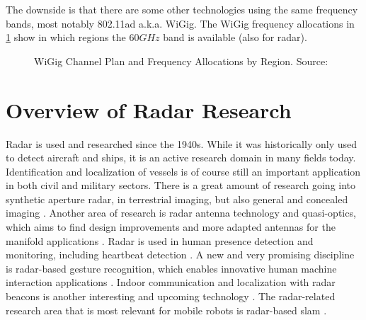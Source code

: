 The downside is that there are some other technologies using the same
frequency bands, most notably 802.11ad a.k.a.
WiGig\cite{AgilentTechnologies2013}. The WiGig frequency allocations in
\cref{fig:wigig} show in which regions the \(60GHz\) band is available (also
for radar).

\begin{figure}[htp]
    \centering
    \def\svgwidth{\linewidth}
    
    \caption{\label{fig:wigig}WiGig Channel Plan and Frequency Allocations by Region. Source: \cite{AgilentTechnologies2013}}
\end{figure}

\section{Overview of Radar Research}\label{overview-of-radar-research}

Radar is used and researched since the 1940s. While it was historically only used to detect aircraft and ships, it is an active research domain in many fields today.
Identification and localization of vessels is of course still an important application in both civil and military sectors.
There is a great amount of research going into synthetic aperture radar, in terrestrial imaging, but also general and concealed imaging \cite{Cumming2004,Axelsson2002,Bury2007,Wang2008,Sarmap.ch2009,Moreira2013,Watts2016}.
Another area of research is radar antenna technology and quasi-optics, which aims to find design improvements and more adapted antennas for the manifold applications \cite{Lu2014,Tewari2015,Gorniak2008,Vinicchayakul2016,Bisognin2014,Ernst2016a,Nordin2016,Craeye2008}.
Radar is used in human presence detection and monitoring, including heartbeat detection \cite{Valmori2016,Novak2017,Zhong2016,Mabrouk2015,Ernst2016,Molchanov2011,Sakamoto2015,Molchanov2011a,Jian2014}.
A new and very promising discipline is radar-based gesture recognition, which enables innovative human machine interaction applications \cite{Lien2016,Kim2016,Molchanov2015}.
Indoor communication and localization with radar beacons is another interesting and upcoming technology \cite{Vinicchayakul2016,Albaidhani2016,Zhong2016,Zhu2016,Segura2012,Marano2010}.
The radar-related research area that is most relevant for mobile robots is radar-based slam \cite{Adams2012,Guan2017,Rapp2016,Rouveure2008,Ristic2016,Marck2013,Deissler2010,Kauffman2014,Guerra2016,Jose2004,Jose2004a,Jose2004b,Jose2005,Gerossier2009,Mullane2010,Deissler2013,Schuster2016,Adams2013,Deissler2012,Seitz2008,Deissler2010,Deissler2009}.

